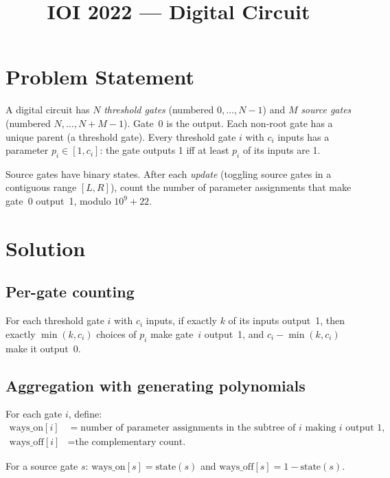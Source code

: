 \documentclass[11pt,a4paper]{article}
\title{IOI 2022 --- Digital Circuit}
\author{}
\date{}
\begin{document}
\maketitle

\section{Problem Statement}

A digital circuit has $N$ \emph{threshold gates} (numbered $0,\ldots,N{-}1$)
and $M$ \emph{source gates} (numbered $N,\ldots,N{+}M{-}1$).  Gate~0 is the
output.  Each non-root gate has a unique parent (a threshold gate).  Every
threshold gate $i$ with $c_i$ inputs has a parameter $p_i \in [1, c_i]$: the
gate outputs 1 iff at least $p_i$ of its inputs are 1.

Source gates have binary states.  After each \emph{update} (toggling source
gates in a contiguous range $[L, R]$), count the number of parameter
assignments that make gate~0 output~1, modulo $10^9 + 22$.

\section{Solution}

\subsection{Per-gate counting}

For each threshold gate $i$ with $c_i$ inputs, if exactly $k$ of its inputs
output~1, then exactly $\min(k, c_i)$ choices of $p_i$ make gate~$i$
output~1, and $c_i - \min(k, c_i)$ make it output~0.

\subsection{Aggregation with generating polynomials}

For each gate $i$, define:
\begin{align*}
  \mathrm{ways\_on}[i]  &= \text{number of parameter assignments in the
                            subtree of } i \text{ making } i \text{ output 1,}\\
  \mathrm{ways\_off}[i] &= \text{the complementary count.}
\end{align*}

For a source gate $s$: $\mathrm{ways\_on}[s] = \text{state}(s)$ and
$\mathrm{ways\_off}[s] = 1 - \text{state}(s)$.
\end{document}
